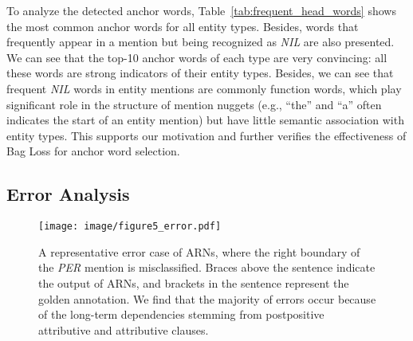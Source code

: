 \documentclass[11pt,a4paper]{article}
\begin{document}
To analyze the detected anchor words, Table~\ref{tab:frequent_head_words} shows the most common anchor words for all entity types. Besides, words that frequently appear in a mention but being recognized as \emph{NIL} are also presented. We can see that the top-10 anchor words of each type are very convincing: all these words are strong indicators of their entity types. Besides, we can see that frequent \emph{NIL} words in entity mentions are commonly function words, which play significant role in the structure of mention nuggets (e.g., ``the'' and ``a'' often indicates the start of an entity mention) but have little semantic association with entity types. This supports our motivation and further verifies the effectiveness of Bag Loss for anchor word selection.


\subsection{Error Analysis}


\begin{table}
\begin{center}
\end{center}
\caption{F1-scores gap between the anchor detector and the entire ARNs (anchor + region). }\label{tab:error_analysis_part}
\end{table}

\begin{figure}
\setlength{\belowcaptionskip}{-0.4cm}
  \centering
  \texttt{[image: image/figure5\_error.pdf]}\\
  \caption{A representative error case of ARNs, where the right boundary of the \emph{PER} mention is misclassified. Braces above the sentence indicate the output of ARNs, and brackets in the sentence represent the golden annotation. We find that the majority of errors occur because of the long-term dependencies stemming from postpositive attributive and attributive clauses.}
  \label{fig:err_case}
\end{figure}
\end{document}

